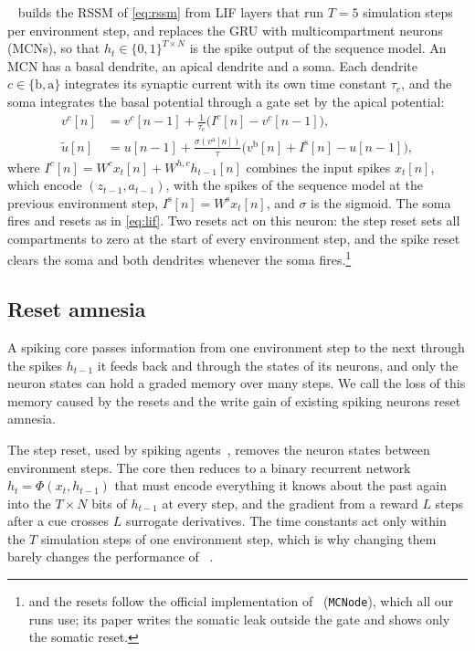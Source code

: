 \swm~\cite{sun2025spikingwm} builds the RSSM of \cref{eq:rssm} from LIF layers that run $T=5$ simulation steps per environment step, and replaces the GRU with multicompartment neurons (MCNs), so that $h_t\in\{0,1\}^{T\times N}$ is the spike output of the sequence model.
An MCN has a basal dendrite, an apical dendrite and a soma.
Each dendrite $c\in\{\mathrm{b},\mathrm{a}\}$ integrates its synaptic current with its own time constant $\tau_c$, and the soma integrates the basal potential through a gate set by the apical potential:
\begin{align}
v^{c}[n] &= v^{c}[n-1] + \frac{1}{\tau_c}\big(I^{c}[n] - v^{c}[n-1]\big), \label{eq:mcn}\\
\tilde u[n] &= u[n-1] + \frac{\sigma(v^{\mathrm{a}}[n])}{\tau}\big(v^{\mathrm{b}}[n] + I^{\mathrm{s}}[n] - u[n-1]\big), \nonumber
\end{align}
where $I^{c}[n] = W^{c}x_t[n] + W^{h,c}h_{t-1}[n]$ combines the input spikes $x_t[n]$, which encode $(z_{t-1},a_{t-1})$, with the spikes of the sequence model at the previous environment step, $I^{\mathrm{s}}[n]=W^{\mathrm{s}}x_t[n]$, and $\sigma$ is the sigmoid.
The soma fires and resets as in \cref{eq:lif}.
Two resets act on this neuron: the step reset sets all compartments to zero at the start of every environment step, and the spike reset clears the soma and both dendrites whenever the soma fires.\footnote{ and the resets follow the official implementation of~\cite{sun2025spikingwm} (\texttt{MCNode}), which all our \swm runs use; its paper writes the somatic leak outside the gate and shows only the somatic reset.}

\subsection{Reset amnesia}
\label{sec:amnesia}

A spiking core passes information from one environment step to the next through the spikes $h_{t-1}$ it feeds back and through the states of its neurons, and only the neuron states can hold a graded memory over many steps.
We call the loss of this memory caused by the resets and the write gain of existing spiking neurons reset amnesia.

The step reset, used by spiking agents~\cite{tang2020popsan,liu2023dsqn,sun2025spikingwm}, removes the neuron states between environment steps.
The core then reduces to a binary recurrent network $h_t=\Phi(x_t,h_{t-1})$ that must encode everything it knows about the past again into the $T\times N$ bits of $h_{t-1}$ at every step, and the gradient from a reward $L$ steps after a cue crosses $L$ surrogate derivatives.
The time constants act only within the $T$ simulation steps of one environment step, which is why changing them barely changes the performance of \swm~\cite{sun2025spikingwm}.


